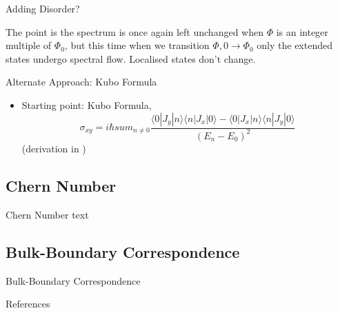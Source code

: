 \documentclass[12pt, aspectratio=169]{beamer}
\begin{document}
\begin{frame}{Adding Disorder?}
    \item <1->{The point is the spectrum is once again left unchanged when $\Phi$ is an integer multiple of $\Phi_0$, but this time when we transition $\Phi, 0 \rightarrow \Phi_0$ only the extended states undergo spectral flow. Localised states don't change.}
\end{frame}

\begin{frame}{Alternate Approach: Kubo Formula}
    \begin{itemize}
        \item <1->{Starting point: Kubo Formula, $$ \sigma_{xy} = i\hbar sum_{n\neq0} \frac{\langle 0 | J_y | n \rangle \langle n | J_x | 0 \rangle - \langle 0 | J_x | n \rangle \langle n | J_y | 0 \rangle}{(E_n - E_0)^2} $$ (derivation in \cite{TongQHE})} 
    \end{itemize}
\end{frame}





\subsection{Chern Number}
\begin{frame}{Chern Number}
    text    
\end{frame}

\subsection{Bulk-Boundary Correspondence}
\begin{frame}{Bulk-Boundary Correspondence}
    
\end{frame}

\begin{frame}{References}
\printbibliography    
\end{frame}
\end{document}

